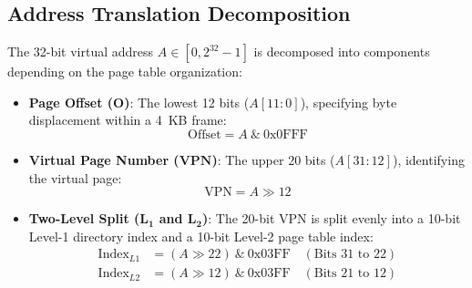 \documentclass[11pt,a4paper]{article}
\begin{document}
\subsection{Address Translation Decomposition}
The 32-bit virtual address $A \in [0, 2^{32}-1]$ is decomposed into components depending on the page table organization:
\begin{itemize}
    \item \textbf{Page Offset ($\mathbf{O}$)}: The lowest 12 bits ($A[11:0]$), specifying byte displacement within a 4~KB frame:
    \begin{equation}
        \text{Offset} = A \ \& \ \text{0x0FFF}
    \end{equation}
    \item \textbf{Virtual Page Number ($\mathbf{VPN}$)}: The upper 20 bits ($A[31:12]$), identifying the virtual page:
    \begin{equation}
        \text{VPN} = A \gg 12
    \end{equation}
    \item \textbf{Two-Level Split ($\mathbf{L_1}$ and $\mathbf{L_2}$)}: The 20-bit VPN is split evenly into a 10-bit Level-1 directory index and a 10-bit Level-2 page table index:
    \begin{align}
        \text{Index}_{L1} &= (A \gg 22) \ \& \ \text{0x03FF} \quad (\text{Bits } 31 \text{ to } 22) \\
        \text{Index}_{L2} &= (A \gg 12) \ \& \ \text{0x03FF} \quad (\text{Bits } 21 \text{ to } 12)
    \end{align}
\end{itemize}
\end{document}
